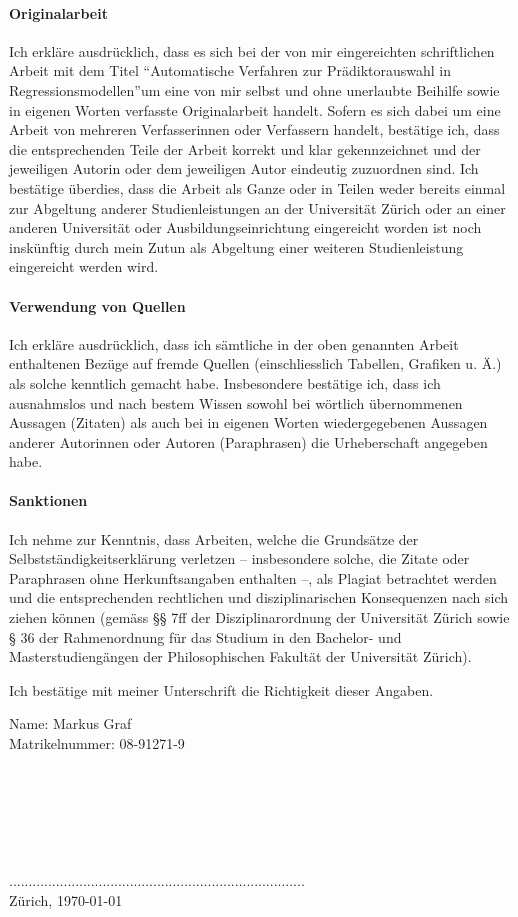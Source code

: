 \documentclass[german,12pt,doc]{apa}
\begin{document}
\paragraph{Originalarbeit}
Ich erkläre ausdrücklich, dass es sich bei der von mir eingereichten schriftlichen Arbeit 
mit dem Titel ``Automatische Verfahren zur Prädiktorauswahl in Regressionsmodellen''um eine von mir selbst und ohne unerlaubte Beihilfe sowie in eigenen Worten verfasste 
Originalarbeit handelt. 
Sofern es sich dabei um eine Arbeit von mehreren Verfasserinnen oder Verfassern handelt, bestätige ich, dass die entsprechenden Teile der Arbeit korrekt und klar gekennzeichnet und der jeweiligen Autorin oder dem jeweiligen Autor eindeutig zuzuordnen sind.
Ich bestätige überdies, dass die Arbeit als Ganze oder in Teilen weder bereits einmal zur Abgeltung anderer Studienleistungen an der Universität Zürich oder an einer anderen Universität oder Ausbildungseinrichtung eingereicht worden ist noch inskünftig durch mein Zutun als Abgeltung einer weiteren Studienleistung eingereicht werden wird. 
 
\paragraph{Verwendung von Quellen} 
Ich erkläre ausdrücklich, dass ich sämtliche in der oben genannten Arbeit enthaltenen Bezüge auf fremde Quellen (einschliesslich Tabellen, Grafiken u. Ä.) als solche kenntlich gemacht habe. Insbesondere bestätige ich, dass ich ausnahmslos und nach bestem Wissen sowohl bei wörtlich übernommenen Aussagen (Zitaten) als auch bei in eigenen Worten wiedergegebenen Aussagen anderer Autorinnen oder Autoren (Paraphrasen) die Urheberschaft angegeben habe. 

\paragraph{Sanktionen}
Ich nehme zur Kenntnis, dass Arbeiten, welche die Grundsätze der 
Selbstständigkeitserklärung verletzen – insbesondere solche, die Zitate oder Paraphrasen ohne Herkunftsangaben enthalten –, als Plagiat betrachtet werden und die entsprechenden rechtlichen und disziplinarischen Konsequenzen nach sich ziehen können (gemäss §§ 7ff der Disziplinarordnung der Universität Zürich sowie § 36 der Rahmenordnung für das Studium in den Bachelor- und Masterstudiengängen der Philosophischen Fakultät der Universität Zürich). 

Ich bestätige mit meiner Unterschrift die Richtigkeit dieser Angaben.

Name: Markus Graf\\
Matrikelnummer:  08-91271-9\\
\\
\\
\\
\\
\\
\\
............................................................................\\
Zürich, \today
\end{document}
